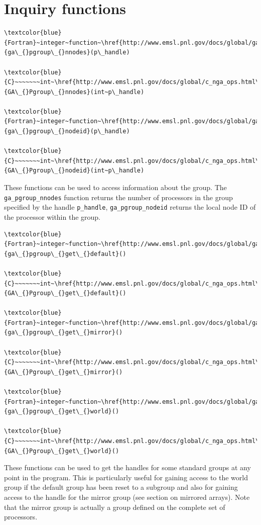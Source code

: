 \section{Inquiry functions}
\begin{verbatim}
\textcolor{blue}{Fortran}~integer~function~\href{http://www.emsl.pnl.gov/docs/global/ga_ops.html\#GA_PGROUP_NNODES}{ga\_{}pgroup\_{}nnodes}(p\_handle)

\textcolor{blue}{C}~~~~~~~int~\href{http://www.emsl.pnl.gov/docs/global/c_nga_ops.html\#GA_PGROUP_NNODES}{GA\_{}Pgroup\_{}nnodes}(int~p\_handle)

\textcolor{blue}{Fortran}~integer~function~\href{http://www.emsl.pnl.gov/docs/global/ga_ops.html\#GA_PGROUP_NODEID}{ga\_{}pgroup\_{}nodeid}(p\_handle)

\textcolor{blue}{C}~~~~~~~int~\href{http://www.emsl.pnl.gov/docs/global/c_nga_ops.html\#GA_PGROUP_NODEID}{GA\_{}Pgroup\_{}nodeid}(int~p\_handle)
\end{verbatim}
These functions can be used to access information about the group.
The \texttt{ga\_pgroup\_nnodes} function returns the number of processors
in the group specified by the handle \texttt{p\_handle}, \texttt{ga\_pgroup\_nodeid}
returns the local node ID of the processor within the group.
\begin{verbatim}
\textcolor{blue}{Fortran}~integer~function~\href{http://www.emsl.pnl.gov/docs/global/ga_ops.html\#GA_PGROUP_GET_DEFAULT}{ga\_{}pgroup\_{}get\_{}default}()

\textcolor{blue}{C}~~~~~~~int~\href{http://www.emsl.pnl.gov/docs/global/c_nga_ops.html\#GA_PGROUP_GET_DEFAULT}{GA\_{}Pgroup\_{}get\_{}default}()

\textcolor{blue}{Fortran}~integer~function~\href{http://www.emsl.pnl.gov/docs/global/ga_ops.html\#GA_PGROUP_GET_MIRROR}{ga\_{}pgroup\_{}get\_{}mirror}()

\textcolor{blue}{C}~~~~~~~int~\href{http://www.emsl.pnl.gov/docs/global/c_nga_ops.html\#GA_PGROUP_GET_MIRROR}{GA\_{}Pgroup\_{}get\_{}mirror}()

\textcolor{blue}{Fortran}~integer~function~\href{http://www.emsl.pnl.gov/docs/global/ga_ops.html\#GA_PGROUP_GET_WORLD}{ga\_{}pgroup\_{}get\_{}world}()

\textcolor{blue}{C}~~~~~~~int~\href{http://www.emsl.pnl.gov/docs/global/c_nga_ops.html\#GA_PGROUP_GET_WORLD}{GA\_{}Pgroup\_{}get\_{}world}()
\end{verbatim}
These functions can be used to get the handles for some standard groups
at any point in the program. This is particularly useful for gaining
access to the world group if the default group has been reset to a
subgroup and also for gaining access to the handle for the mirror
group (see section on mirrored arrays). Note that the mirror group
is actually a group defined on the complete set of processors. 


